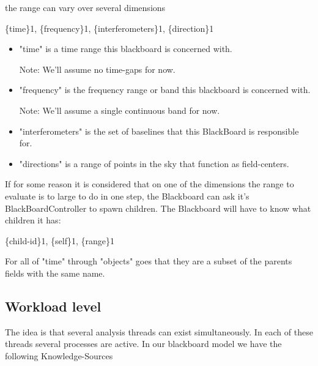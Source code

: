 \documentclass[]{lofar}
\begin{document}
      the range can vary over several dimensions

      \{time\}1, \{frequency\}1, \{interferometers\}1, \{direction\}1

      \begin{itemize}

	\item 

          "time" is a time range this blackboard is concerned with.
          \begin{em}\large{Note: }
            We'll assume no time-gaps for now.
          \end{em}

	\item 

          "frequency" is the frequency range or band this blackboard
          is concerned with.
          \begin{em}\large{Note: }
            We'll assume a single continuous band for now.
          \end{em}

	\item 

          "interferometers" is the set of baselines that this
          BlackBoard is responsible for.

	\item 

          "directions" is a range of points in the sky that function
          as field-centers.

      \end{itemize}

      If for some reason it is considered that on one of the
      dimensions the range to evaluate is to large to do in one step,
      the Blackboard can ask it's BlackBoardController to spawn
      children. The Blackboard will have to know what children it has:

      \{child-id\}1, \{self\}1, \{range\}1

      For all of "time" through "objects" goes that they are a subset
      of the parents fields with the same name.

    \subsection{Workload level}
    \label{id2721606}\hypertarget{id2721606}{}%

      The idea is that several analysis threads can exist
      simultaneously. In each of these threads several processes are
      active. In our blackboard model we have the following
      Knowledge-Sources
\end{document}
